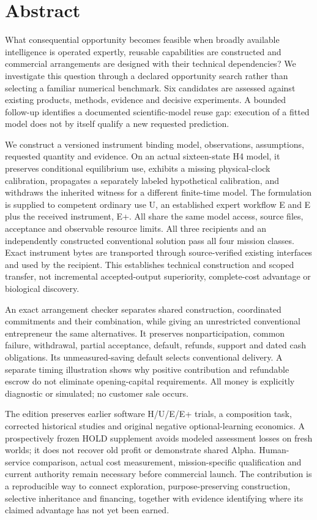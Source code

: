 \documentclass[11pt,letterpaper]{article}
\begin{document}
\section*{Abstract}
What consequential opportunity becomes feasible when broadly available intelligence is operated expertly, reusable capabilities are constructed and commercial arrangements are designed with their technical dependencies? We investigate this question through a declared opportunity search rather than selecting a familiar numerical benchmark. Six candidates are assessed against existing products, methods, evidence and decisive experiments. A bounded follow-up identifies a documented scientific-model reuse gap: execution of a fitted model does not by itself qualify a new requested prediction.

We construct a versioned instrument binding model, observations, assumptions, requested quantity and evidence. On an actual sixteen-state H4 model, it preserves conditional equilibrium use, exhibits a missing physical-clock calibration, propagates a separately labeled hypothetical calibration, and withdraws the inherited witness for a different finite-time model. The formulation is supplied to competent ordinary use U, an established expert workflow E and E plus the received instrument, E+. All share the same model access, source files, acceptance and observable resource limits. All three recipients and an independently constructed conventional solution pass all four mission classes. Exact instrument bytes are transported through source-verified existing interfaces and used by the recipient. This establishes technical construction and scoped transfer, not incremental accepted-output superiority, complete-cost advantage or biological discovery.

An exact arrangement checker separates shared construction, coordinated commitments and their combination, while giving an unrestricted conventional entrepreneur the same alternatives. It preserves nonparticipation, common failure, withdrawal, partial acceptance, default, refunds, support and dated cash obligations. Its unmeasured-saving default selects conventional delivery. A separate timing illustration shows why positive contribution and refundable escrow do not eliminate opening-capital requirements. All money is explicitly diagnostic or simulated; no customer sale occurs.

The edition preserves earlier software H/U/E/E+ trials, a composition task, corrected historical studies and original negative optional-learning economics. A prospectively frozen HOLD supplement avoids modeled assessment losses on fresh worlds; it does not recover old profit or demonstrate shared Alpha. Human-service comparison, actual cost measurement, mission-specific qualification and current authority remain necessary before commercial launch. The contribution is a reproducible way to connect exploration, purpose-preserving construction, selective inheritance and financing, together with evidence identifying where its claimed advantage has not yet been earned.
\end{document}
